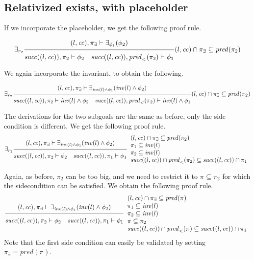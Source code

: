 \documentclass{article}
\newcommand{\proofrule}[3][]{#1 \frac{\raisebox{.7ex}{\normalsize{$#2$}}}
  {\raisebox{-1.0ex}{\normalsize{$#3$}}}}
\newcommand{\placeholder}[1][]{\pi_{#1}}
\newcommand{\loc}{l}
\newcommand{\region}{\mathit{cc}}
\newcommand{\suc}{\mathit{succ}}
\newcommand{\pre}{\mathit{pred}}
\newcommand{\inv}{\mathit{inv}}
\begin{document}
\subsection{Relativized exists, with placeholder}
If we incorporate the placeholder, we get the following proof rule.

\[
\proofrule[\exists_{r_2}]
{(\loc, \region), \placeholder[\exists] \vdash \exists_{\phi_1}(\phi_2)}
{\suc((\loc,\region)), \placeholder[2] \vdash \phi_2
\quad
\suc((\loc, \region)), \pre_{<}(\placeholder[2]) \vdash \phi_1
}
(\loc, \region) \cap \placeholder[\exists] \subseteq \pre(\placeholder[2])
\]

We again incorporate the invariant, to obtain the following.

\[
\proofrule[\exists_{r_2}]
{(\loc, \region), \placeholder[\exists] \vdash \exists_{\inv(\loc) \land \phi_1}(\inv(\loc) \land \phi_2)}
{\suc((\loc,\region)), \placeholder[2] \vdash \inv(\loc) \land \phi_2
\quad
\suc((\loc, \region)), \pre_{<}(\placeholder[2]) \vdash \inv(\loc) \land \phi_1
}
(\loc, \region) \cap \placeholder[\exists] \subseteq \pre(\placeholder[2])
\]

The derivations for the two subgoals are the same as before, only the side condition is different. We get the following proof rule.
\[
\proofrule[\exists_{r_2}]
{(\loc, \region), \placeholder[\exists] \vdash \exists_{\inv(\loc) \land \phi_1}(\inv(\loc) \land \phi_2)}
{\suc((\loc,\region)), \placeholder[2] \vdash \phi_2
\quad \suc((\loc, \region)), \placeholder[1] \vdash \phi_1
}
\begin{array}{l}
(\loc, \region) \cap \placeholder[\exists] \subseteq \pre(\placeholder[2]) \\
\placeholder[1] \subseteq \inv(\loc) \\
\placeholder[2] \subseteq \inv(\loc) \\
\suc((\loc, \region)) \cap \pre_{<}(\placeholder[2]) \subseteq \suc((\loc, \region)) \cap \placeholder[1]
\end{array}
\]

Again, as before, $\placeholder[2]$ can be too big, and we need to restrict it to $\placeholder \subseteq \placeholder[2]$ for which the sidecondition can be satisfied. We obtain the following proof rule.
\[
\proofrule
{(\loc, \region), \placeholder[\exists] \vdash \exists_{\inv(\loc) \land \phi_1}(\inv(\loc) \land \phi_2)}
{\suc((\loc,\region)), \placeholder[2] \vdash \phi_2
\quad \suc((\loc, \region)), \placeholder[1] \vdash \phi_1
}
\begin{array}{l}
(\loc, \region) \cap \placeholder[\exists] \subseteq \pre(\placeholder) \\
\placeholder[1] \subseteq \inv(\loc) \\
\placeholder[2] \subseteq \inv(\loc) \\
\placeholder \subseteq \placeholder[2] \\
\suc((\loc, \region)) \cap \pre_{<}(\placeholder) \subseteq \suc((\loc, \region)) \cap \placeholder[1]
\end{array}
\]
Note that the first side condition can easily be validated by setting $\placeholder[\exists] = \pre(\placeholder)$.
\end{document}
